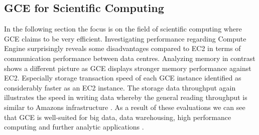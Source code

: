\subsection{GCE for Scientific Computing}
In the following section the focus is on the field of scientific computing where GCE claims to be very efficient. Investigating performance regarding Compute Engine surprisingly reveals some disadvantages compared to EC2 in terms of communication performance between data centres. Analyzing memory in contrast shows a different picture as GCE displays stronger memory performance against EC2. Especially storage transaction speed of each GCE instance identified as considerably faster as an EC2 instance. The storage data throughput again illustrates the speed in writing data whereby the general reading throughput is similar to Amazons infrastructure \cite{GCE_2013}. As a result of these evaluations we can see that GCE is well-suited for big data, data warehousing, high performance computing and further analytic applications \cite{IaaS_2015}.